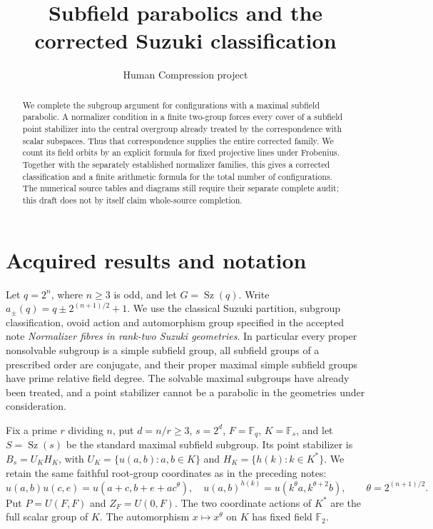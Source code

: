 \documentclass[11pt,a4paper]{article}
\title{Subfield parabolics and the corrected Suzuki classification}
\author{Human Compression project}\date{}
\newcommand{\F}{\mathbb F}
\newcommand{\Sz}{\operatorname{Sz}}
\begin{document}
\maketitle
\begin{abstract}
We complete the subgroup argument for configurations with a maximal
subfield parabolic. A normalizer condition in a finite two-group forces
every cover of a subfield point stabilizer into the central overgroup
already treated by the correspondence with scalar subspaces. Thus that
correspondence supplies the entire corrected family. We count its field
orbits by an explicit formula for fixed projective lines under Frobenius.
Together with the separately established normalizer families, this gives
a corrected classification and a finite arithmetic formula for the total
number of configurations. The numerical source tables and diagrams still
require their separate complete audit; this draft does not by itself
claim whole-source completion.
\end{abstract}

\section{Acquired results and notation}
Let $q=2^n$, where $n\ge3$ is odd, and let $G=\Sz(q)$. Write
$a_\pm(q)=q\pm2^{(n+1)/2}+1$. We use the classical Suzuki
partition, subgroup classification, ovoid action and automorphism group
specified in the accepted note \emph{Normalizer fibres in rank-two
Suzuki geometries}. In particular every proper nonsolvable subgroup is
a simple subfield group, all subfield groups of a prescribed order are
conjugate, and their proper maximal simple subfield groups have prime
relative field degree. The solvable maximal subgroups have already
been treated, and a point stabilizer cannot be a parabolic in the
geometries under consideration.

Fix a prime $r$ dividing $n$, put $d=n/r\ge3$, $s=2^d$,
$F=\F_q$, $K=\F_s$, and let $S=\Sz(s)$ be the standard maximal
subfield subgroup. Its point stabilizer is
$B_s=U_KH_K$, with $U_K=\{u(a,b):a,b\in K\}$ and
$H_K=\{h(k):k\in K^*\}$. We retain the same faithful root-group
coordinates as in the preceding notes:
\[
 u(a,b)u(c,e)=u(a+c,b+e+ac^\theta),\quad
 u(a,b)^{h(k)}=u(k^\theta a,k^{\theta+2}b),
 \qquad\theta=2^{(n+1)/2}.
                                                        \tag{1}
\]
Put $P=U(F,F)$ and $Z_F=U(0,F)$. The two coordinate actions of
$K^*$ are the full scalar group of $K$. The automorphism
$x\mapsto x^\theta$ on $K$ has fixed field $\F_2$.
\end{document}

